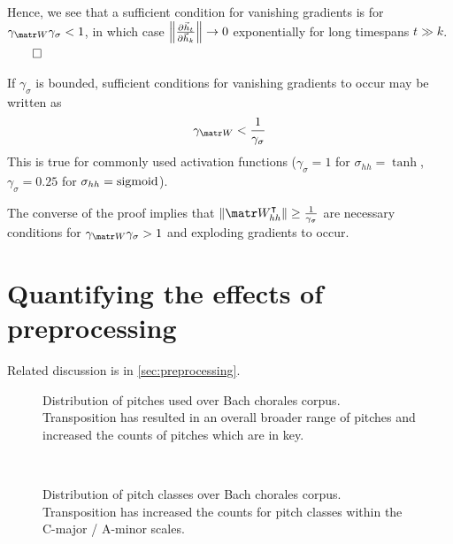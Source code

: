 Hence, we see that a sufficient condition for vanishing gradients is
for $\gamma_{\W} \gamma_\sigma < 1$, in which case $\left\| \frac{\partial \vec{h}_t}{\partial \vec{h}_k} \right\| \to 0$
exponentially for long timespans $t \gg k$. $\qed$

If $\gamma_\sigma$ is bounded, sufficient
conditions for vanishing gradients to occur may be written as
\begin{equation}
    \gamma_{\W} < \frac{1}{\gamma_\sigma}
\end{equation}
This is true for commonly used activation functions (\eg $\gamma_\sigma = 1$
for $\sigma_{hh} = \tanh$, $\gamma_\sigma = 0.25$ for $\sigma_{hh} =
\operatorname*{sigmoid}$).

The converse of the proof implies that $\| \W_{hh}^\tp \| \geq
\frac{1}{\gamma_\sigma}$ are necessary conditions for $\gamma_{\W}
\gamma_\sigma > 1$ and exploding gradients to occur.

\section{Quantifying the effects of preprocessing}\label{sec:quantify-effects-preprocessing}

Related discussion is in \vref{sec:preprocessing}.

\begin{landscape}
  \begin{figure}[p]
    \centering
    \begin{subfigure}[c]{1.0\textwidth}
        \centering
        
    \end{subfigure}
    \begin{subfigure}[c]{1.0\textwidth}
        \centering
        
    \end{subfigure}
    \caption{Distribution of pitches used over Bach chorales corpus.
      Transposition has resulted in an overall broader range of pitches and
    increased the counts of pitches which are in key.}
    \label{fig:pitch-key-standardization}
  \end{figure}
\end{landscape}

\begin{figure}[htbp]
    \centering
    \begin{subfigure}[t]{0.48\textwidth}
        \centering
        
    \end{subfigure}
    ~
    \begin{subfigure}[t]{0.48\textwidth}
        \centering
        
    \end{subfigure}
    \caption{Distribution of pitch classes over Bach chorales corpus. Transposition has increased the counts
    for pitch classes within the C-major / A-minor scales.}
    \label{fig:pc-key-standardization}
\end{figure}

